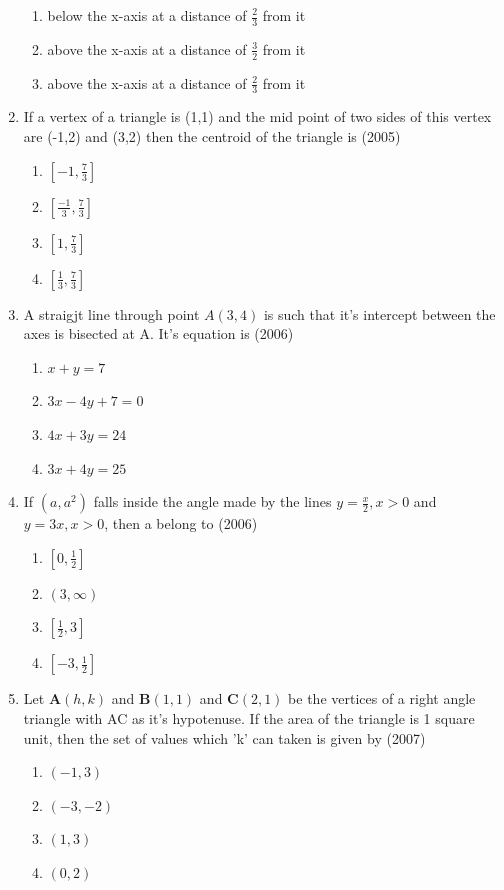 \documentclass[12pt]{article}
\providecommand{\sbrak}[1]{\ensuremath{{}\left[#1\right]}}
\let\vec\mathbf
\begin{document}
\begin{enumerate}
\begin{enumerate}
\item below the x-axis at a distance of $\frac{2}{3}$ from it
\item above the x-axis at a distance of $\frac{3}{2}$ from it
\item above the x-axis at a distance of $\frac{2}{3}$ from it
\end{enumerate}
\item If a vertex of a triangle is (1,1) and the mid point of two sides of this vertex are (-1,2) and (3,2) then the centroid of the triangle is (2005)
\begin{enumerate}
\item $\sbrak{-1,\frac{7}{3}}$ 
\item $\sbrak{\frac{-1}{3},\frac{7}{3}}$ 
\item $\sbrak{1,\frac{7}{3}}$  
\item $\sbrak{\frac{1}{3},\frac{7}{3}}$ 
\end{enumerate}
\item A straigjt line through point $A(3,4)$ is such that it's intercept between the axes is bisected at A. It's equation is (2006)
\begin{enumerate}
\item $x+y=7$ 
\item $3x-4y+7=0$  
\item $4x+3y=24$ 
\item $3x+4y=25$
\end{enumerate}
\item If $(a,a^2)$ falls inside the angle made by the lines $y= \frac{x}{2}, x>0$ and $y=3x, x>0$, then a belong to (2006)
\begin{enumerate}
\item $\sbrak{0,\frac{1}{2}}$ 
\item $(3,\infty)$ 
\item $\sbrak{\frac{1}{2},3}$ 
\item $\sbrak{-3,\frac{1}{2}}$
\end{enumerate}
\item Let $\vec{A}(h,k)$ and $\vec{B}(1,1)$ and $\vec{C}(2,1)$ be the vertices of a right angle triangle with AC as it's hypotenuse. If the area of the triangle is 1 square unit, then the set of values which 'k' can taken is given by (2007)
\begin{enumerate}
\item $(-1,3)$ 
\item $(-3,-2)$
\item $(1,3)$ 
\item $(0,2)$

\end{enumerate}
\end{enumerate}
\end{document}
